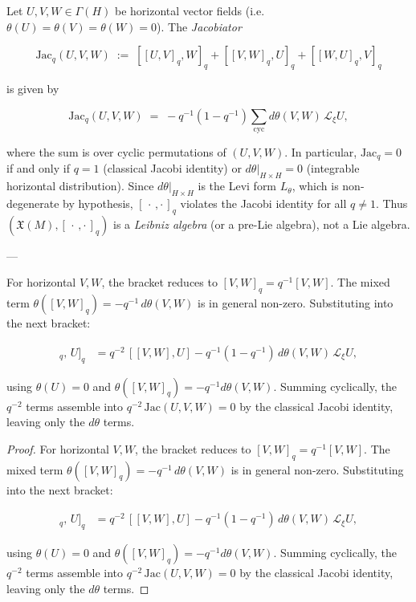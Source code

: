 \begin{proposition}
  \label{prop:q-jacobiator}
Let $U, V, W \in \Gamma(H)$ be horizontal vector fields (i.e.
$\theta(U) = \theta(V) = \theta(W) = 0$). The \emph{Jacobiator}

\[
\mathrm{Jac}_q(U,V,W)
  \;:=\; [[U,V]_q, W]_q + [[V,W]_q, U]_q + [[W,U]_q, V]_q
\]

is given by

\[
\mathrm{Jac}_q(U,V,W)
  \;=\; -q^{-1}(1-q^{-1})\!\sum_{\mathrm{cyc}}
        d\theta(V,W)\,\mathcal{L}_\xi U,
\]

where the sum is over cyclic permutations of $(U,V,W)$. In particular,
$\mathrm{Jac}_q = 0$ if and only if $q = 1$ (classical Jacobi identity)
or $d\theta|_{H \times H} = 0$ (integrable horizontal distribution).
Since $d\theta|_{H \times H}$ is the Levi form $L_\theta$, which is
non-degenerate by hypothesis, $[\,\cdot\,,\cdot\,]_q$ violates the Jacobi
identity for all $q \neq 1$. Thus $(\mathfrak{X}(M), [\,\cdot\,,\cdot\,]_q)$
is a \emph{Leibniz algebra} (or a pre-Lie algebra), not a Lie algebra.

---

For horizontal $V, W$, the bracket reduces to $[V,W]_q = q^{-1}[V,W]$.
The mixed term $\theta([V,W]_q) = -q^{-1}\,d\theta(V,W)$ is in general
non-zero. Substituting into the next bracket:

\begin{align*}
  [[V,W]_q,\, U]_q
  &= q^{-2}\,[[V,W],U]
    - q^{-1}(1-q^{-1})\,d\theta(V,W)\,\mathcal{L}_\xi U,
\end{align*}

using $\theta(U)=0$ and $\theta([V,W]_q) = -q^{-1}d\theta(V,W)$.
Summing cyclically, the $q^{-2}$ terms assemble into $q^{-2}\,\mathrm{Jac}(U,V,W) = 0$
by the classical Jacobi identity, leaving only the $d\theta$ terms.
\end{proposition}
\begin{proof}
For horizontal $V, W$, the bracket reduces to $[V,W]_q = q^{-1}[V,W]$.
The mixed term $\theta([V,W]_q) = -q^{-1}\,d\theta(V,W)$ is in general
non-zero. Substituting into the next bracket:

\begin{align*}
  [[V,W]_q,\, U]_q
  &= q^{-2}\,[[V,W],U]
    - q^{-1}(1-q^{-1})\,d\theta(V,W)\,\mathcal{L}_\xi U,
\end{align*}

using $\theta(U)=0$ and $\theta([V,W]_q) = -q^{-1}d\theta(V,W)$.
Summing cyclically, the $q^{-2}$ terms assemble into $q^{-2}\,\mathrm{Jac}(U,V,W) = 0$
by the classical Jacobi identity, leaving only the $d\theta$ terms.
\end{proof}

